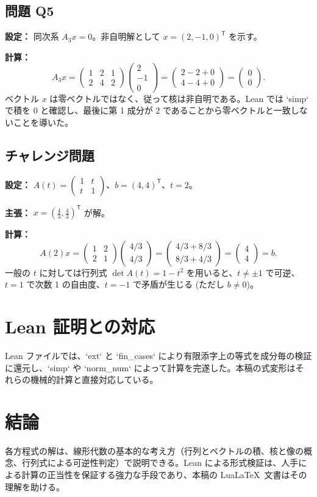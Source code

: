 \documentclass[a4paper]{ltjsarticle}
\begin{document}
\subsection{問題 Q5}
\textbf{設定：} 同次系 $A_3 x = 0$。非自明解として $x = (2, -1, 0)^\mathsf{T}$ を示す。
\par
\textbf{計算：}
\[
A_3 x = \begin{pmatrix}1 & 2 & 1\\ 2 & 4 & 2\end{pmatrix}\begin{pmatrix}2\\ -1\\ 0\end{pmatrix} = \begin{pmatrix}2 - 2 + 0\\ 4 - 4 + 0\end{pmatrix} = \begin{pmatrix}0\\0\end{pmatrix}.
\]
ベクトル $x$ は零ベクトルではなく、従って核は非自明である。Lean では `simp` で積を 0 と確認し、最後に第 1 成分が 2 であることから零ベクトルと一致しないことを導いた。

\subsection{チャレンジ問題}
\textbf{設定：} $A(t) = \begin{pmatrix}1 & t\\ t & 1\end{pmatrix}$、$b = (4,4)^\mathsf{T}$、$t = 2$。
\par
\textbf{主張：} $x = \left(\tfrac{4}{3}, \tfrac{4}{3}\right)^\mathsf{T}$ が解。
\par
\textbf{計算：}
\[
A(2) x = \begin{pmatrix}1 & 2\\ 2 & 1\end{pmatrix} \begin{pmatrix}4/3\\ 4/3\end{pmatrix} = \begin{pmatrix}4/3 + 8/3\\ 8/3 + 4/3\end{pmatrix} = \begin{pmatrix}4\\4\end{pmatrix} = b.
\]
一般の $t$ に対しては行列式 $\det A(t) = 1 - t^2$ を用いると、$t \neq \pm 1$ で可逆、$t = 1$ で次数 1 の自由度、$t = -1$ で矛盾が生じる (ただし $b \neq 0$)。

\section{Lean 証明との対応}
Lean ファイルでは、`ext` と `fin_cases` により有限添字上の等式を成分毎の検証に還元し、`simp` や `norm_num` によって計算を完遂した。本稿の式変形はそれらの機械的計算と直接対応している。

\section{結論}
各方程式の解は、線形代数の基本的な考え方（行列とベクトルの積、核と像の概念、行列式による可逆性判定）で説明できる。Lean による形式検証は、人手による計算の正当性を保証する強力な手段であり、本稿の Lua\LaTeX\ 文書はその理解を助ける。
\end{document}
